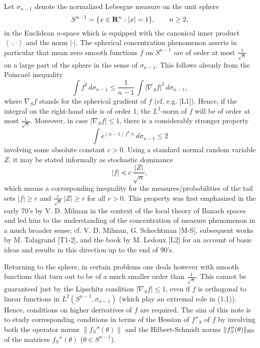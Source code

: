 \documentclass[reqno,12pt]{amsart}
\theoremstyle{plain}
\begin{document}
\vskip2mm
\noindent
Let $\sigma_{n-1}$ denote the normalized Lebesgue measure on the unit sphere 
$$
S^{n-1} = \{x \in {{\bf R}}^n: |x| = 1\}, \qquad n\geq 2,
$$ 
in the Euclidean $n$-space which is equipped with the canonical inner 
product $\left<\cdot,\cdot\right>$ and the norm $|\cdot|$. The spherical 
concentration phenomenon asserts in particular that mean zero smooth 
functions $f$ on $S^{n-1}$ are of order at most $\frac{1}{\sqrt{n}}$ 
on a large part of the sphere in the sense of $\sigma_{n-1}$. 
This follows already from the Poincar\'e inequality
\begin{equation}
\int f^2\,d\sigma_{n-1} \leq 
\frac{1}{n-1}\,\int |\nabla_S f|^2\,d\sigma_{n-1},
\end{equation}
where $\nabla_S f$ stands for the spherical gradient of $f$ (cf. e.g. [L1]). 
Hence, if the integral on the right-hand side is of order 1, the $L^2$-norm 
of $f$ will be of order at most $\frac{1}{\sqrt{n}}$. Moreover, in case 
$|\nabla_S f| \leq 1$, there is a considerably stronger property 
$$
\int e^{(n-1)\, f^2/c}\,d\sigma_{n-1} \leq 2
$$
involving some absolute constant $c>0$. Using a standard normal random 
variable $Z$, it may be stated informally as stochastic dominance
\begin{equation}
|f| \preceq c\,\frac{|Z|}{\sqrt{n}},
\end{equation}
which means a corresponding inequality for the measures/probabilities of 
the tail sets $|f| \geq r$ and $\frac{c}{\sqrt{n}}\, |Z| \geq r$ for all 
$r > 0$.
This property was first emphasized in the early 70's by V. D. Milman 
in the context of the local theory of Banach spaces and led him to the 
understanding of the concentration of measure phenomenon in a much broader 
sense; cf. V. D. Milman, G. Schechtman [M-S], subsequent works by 
M. Talagrand [T1-2], and the book by M. Ledoux [L2] for an account of 
basic ideas and results in this direction up to the end of 90's.

Returning to the sphere, in certain problems one deals however with 
smooth functions that turn out to be of a much smaller order than 
$\frac{1}{\sqrt{n}}$. This cannot be guaranteed just by the Lipschitz 
condition $|\nabla_S f| \leq 1$, even if $f$ is orthogonal to linear 
functions in $L^2(S^{n-1},\sigma_{n-1})$ (which play an extremal role 
in (1.1)). Hence, conditions on higher derivatives of $f$ are required.
The aim of this note is to study corresponding conditions in terms 
of the Hessian of $f''_S$ of $f$ by involving both 
the operator norms $\|f_S''(\theta)\|$ and the Hilbert-Schmidt norms
$\|f_S''(\theta)\|_{\rm HS}$ of the matrices $f_S''(\theta)$ 
($\theta \in S^{n-1}$).
\end{document}
